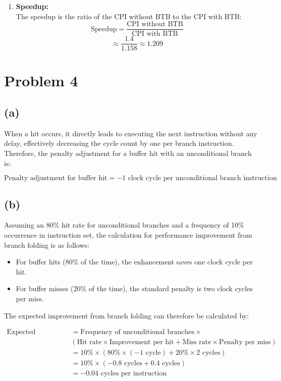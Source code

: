 \documentclass{article}
\begin{document}
\begin{enumerate}
  \item \textbf{Speedup:} \\
  The speedup is the ratio of the CPI without BTB to the CPI with BTB:
  \begin{equation*}
    \text{Speedup} = \frac{\text{CPI without BTB}}{\text{CPI with BTB}}
  \end{equation*}
  \begin{equation*}
    \approx \frac{1.4}{1.158} \approx 1.209
  \end{equation*}
\end{enumerate}

\section{Problem 4}

\subsection*{(a)}
When a hit occurs, it directly leads to executing the next instruction without any delay, effectively decreasing the cycle count by one per branch instruction. Therefore, the penalty adjustment for a buffer hit with an unconditional branch is:

\begin{equation*}
    \text{Penalty adjustment for buffer hit} = -1 \text{ clock cycle per unconditional branch instruction}
\end{equation*}

\subsection*{(b)}
Assuming an 80\% hit rate for unconditional branches and a frequency of 10\% occurrence in instruction set, the calculation for performance improvement from branch folding is as follows:

\begin{itemize}
  \item For buffer hits (80\% of the time), the enhancement saves one clock cycle per hit.
  \item For buffer misses (20\% of the time), the standard penalty is two clock cycles per miss.
\end{itemize}

The expected improvement from branch folding can therefore be calculated by:

\[
\begin{aligned}
    \text{Expected improvement} &= \text{Frequency of unconditional branches} \times \\
    &(\text{Hit rate} \times \text{Improvement per hit} + \text{Miss rate} \times \text{Penalty per miss})\\
    &= 10\% \times (80\% \times (-1 \text{ cycle}) + 20\% \times 2 \text{ cycles})\\
    &= 10\% \times (-0.8 \text{ cycles} + 0.4 \text{ cycles})\\
    &= -0.04 \text{ cycles per instruction}
\end{aligned}
\]
\end{document}
